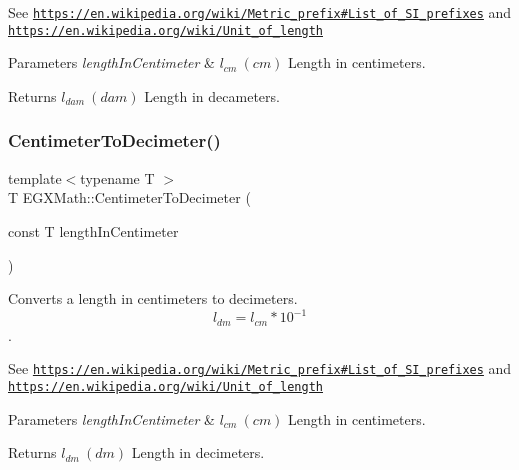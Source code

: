 See \href{https://en.wikipedia.org/wiki/Metric_prefix#List_of_SI_prefixes}{\tt https\+://en.\+wikipedia.\+org/wiki/\+Metric\+\_\+prefix\#\+List\+\_\+of\+\_\+\+S\+I\+\_\+prefixes} and \href{https://en.wikipedia.org/wiki/Unit_of_length}{\tt https\+://en.\+wikipedia.\+org/wiki/\+Unit\+\_\+of\+\_\+length} 
\begin{DoxyParams}{Parameters}
{\em length\+In\+Centimeter} & $ l_{cm}\ (cm)$ Length in centimeters. \\
\hline
\end{DoxyParams}
\begin{DoxyReturn}{Returns}
$ l_{dam}\ (dam)$ Length in decameters. 
\end{DoxyReturn}
\mbox{\label{group___e_g_x_math-_conversions-_length_conversions-_centimeter-_s_i_gae1263088b67f23124cc7770d66fbb38b}} 
\subsubsection{\texorpdfstring{Centimeter\+To\+Decimeter()}{CentimeterToDecimeter()}}
{\footnotesize\ttfamily template$<$typename T $>$ \\
T E\+G\+X\+Math\+::\+Centimeter\+To\+Decimeter (\begin{DoxyParamCaption}\item[{const T}]{length\+In\+Centimeter }\end{DoxyParamCaption})}



Converts a length in centimeters to decimeters. \[ l_{dm}=l_{cm} * 10^{-1} \]. 

See \href{https://en.wikipedia.org/wiki/Metric_prefix#List_of_SI_prefixes}{\tt https\+://en.\+wikipedia.\+org/wiki/\+Metric\+\_\+prefix\#\+List\+\_\+of\+\_\+\+S\+I\+\_\+prefixes} and \href{https://en.wikipedia.org/wiki/Unit_of_length}{\tt https\+://en.\+wikipedia.\+org/wiki/\+Unit\+\_\+of\+\_\+length} 
\begin{DoxyParams}{Parameters}
{\em length\+In\+Centimeter} & $ l_{cm}\ (cm)$ Length in centimeters. \\
\hline
\end{DoxyParams}
\begin{DoxyReturn}{Returns}
$ l_{dm}\ (dm)$ Length in decimeters. 
\end{DoxyReturn}
\mbox{\label{group___e_g_x_math-_conversions-_length_conversions-_centimeter-_s_i_ga8b69e702b6a245a68f57d52474f21c1a}} 
